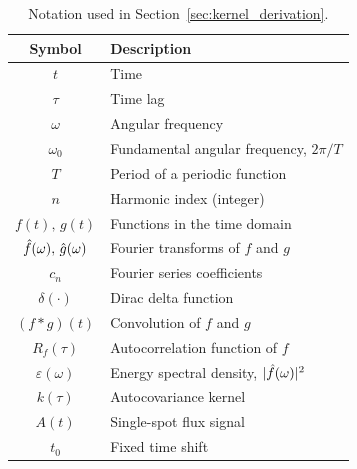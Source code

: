 \begin{table}[ht!]
\centering
\caption{Notation used in Section~\ref{sec:kernel_derivation}.}
\label{tab:notation_fourier}
\begin{tabular}{cl}
    \hline
    \textbf{Symbol} & \textbf{Description} \\
    \hline
    $t$ & Time \\
    $\tau$ & Time lag \\
    $\omega$ & Angular frequency \\
    $\omega_0$ & Fundamental angular frequency, $2\pi/T$ \\
    $T$ & Period of a periodic function \\
    $n$ & Harmonic index (integer) \\
    $f(t),\, g(t)$ & Functions in the time domain \\
    $\hat{f}(\omega),\, \hat{g}(\omega)$ & Fourier transforms of $f$ and $g$ \\
    $c_n$ & Fourier series coefficients \\
    $\delta(\cdot)$ & Dirac delta function \\
    $(f \ast g)(t)$ & Convolution of $f$ and $g$ \\
    $R_f(\tau)$ & Autocorrelation function of $f$ \\
    $\varepsilon(\omega)$ & Energy spectral density, $|\hat{f}(\omega)|^2$ \\
    $k(\tau)$ & Autocovariance kernel \\
    $A(t)$ & Single-spot flux signal \\
    $t_0$ & Fixed time shift \\
    \hline
\end{tabular}
\end{table}
